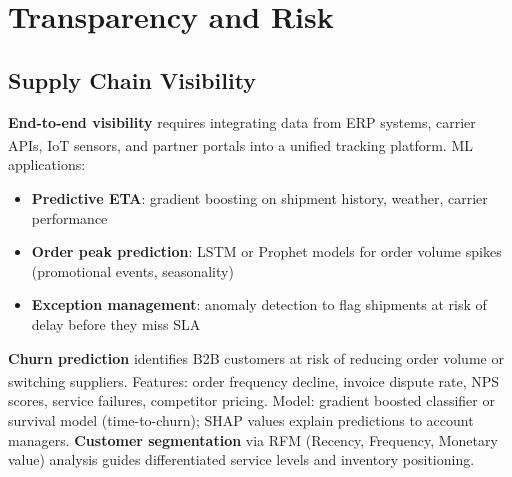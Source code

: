 \section{Transparency and Risk}

\subsection{Supply Chain Visibility}

\begin{tcbitemize}[ skin=sectionraster ]

    \tcbitem[title=Real-Time Tracking and Order Prediction, raster multicolumn=3]
    \textbf{End-to-end visibility} requires integrating data from ERP systems, carrier APIs, IoT sensors, and partner portals into a unified tracking platform\textsuperscript{\cite[][pp.~72--80]{chopraSupplyChainManagement2019}}.
    ML applications:
    \begin{itemize}
        \item \textbf{Predictive ETA}: gradient boosting on shipment history, weather, carrier performance
        \item \textbf{Order peak prediction}: LSTM or Prophet models for order volume spikes (promotional events, seasonality)
        \item \textbf{Exception management}: anomaly detection to flag shipments at risk of delay before they miss SLA
    \end{itemize}

    \tcbitem[title=Customer and Churn Analytics, raster multicolumn=3]
    \textbf{Churn prediction} identifies B2B customers at risk of reducing order volume or switching suppliers\textsuperscript{\cite[][p.~85]{chopraSupplyChainManagement2019}}.
    Features: order frequency decline, invoice dispute rate, NPS scores, service failures, competitor pricing.
    Model: gradient boosted classifier or survival model (time-to-churn); SHAP values explain predictions to account managers.
    \textbf{Customer segmentation} via RFM (Recency, Frequency, Monetary value) analysis guides differentiated service levels and inventory positioning.

\end{tcbitemize}

